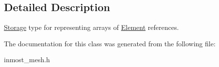 \subsection{Detailed Description}
\hyperlink{classINMOST_1_1Storage}{Storage} type for representing arrays of \hyperlink{classINMOST_1_1Element}{Element} references. 

The documentation for this class was generated from the following file\-:\begin{DoxyCompactItemize}
\item 
inmost\-\_\-mesh.\-h\end{DoxyCompactItemize}
